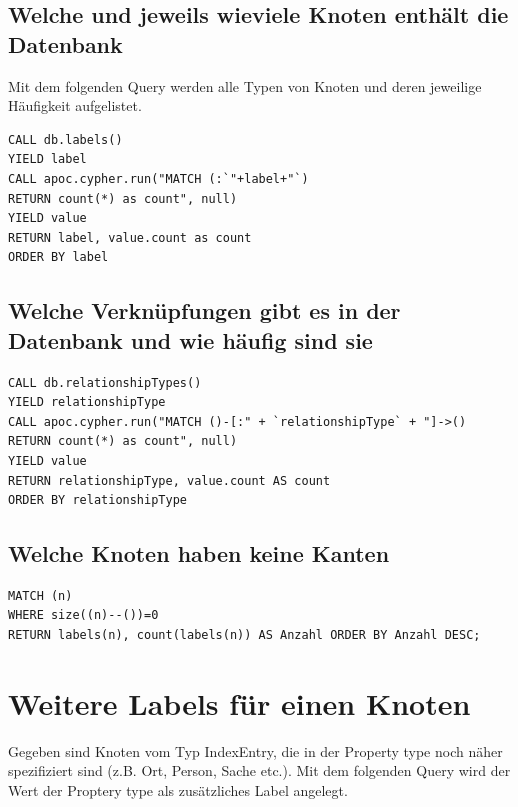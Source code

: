 \documentclass[ngerman,]{scrreprt}
\begin{document}
\subsection{Welche und jeweils wieviele Knoten enthält die Datenbank}\label{welche-und-jeweils-wieviele-knoten-enthuxe4lt-die-datenbank}

Mit dem folgenden Query werden alle Typen von Knoten und deren jeweilige Häufigkeit aufgelistet.

\begin{verbatim}
CALL db.labels()
YIELD label
CALL apoc.cypher.run("MATCH (:`"+label+"`)
RETURN count(*) as count", null)
YIELD value
RETURN label, value.count as count
ORDER BY label
\end{verbatim}

\subsection{Welche Verknüpfungen gibt es in der Datenbank und wie häufig sind sie}\label{welche-verknuxfcpfungen-gibt-es-in-der-datenbank-und-wie-huxe4ufig-sind-sie}

\begin{verbatim}
CALL db.relationshipTypes()
YIELD relationshipType
CALL apoc.cypher.run("MATCH ()-[:" + `relationshipType` + "]->()
RETURN count(*) as count", null)
YIELD value
RETURN relationshipType, value.count AS count
ORDER BY relationshipType
\end{verbatim}

\subsection{Welche Knoten haben keine Kanten}\label{welche-knoten-haben-keine-kanten}

\begin{verbatim}
MATCH (n)
WHERE size((n)--())=0
RETURN labels(n), count(labels(n)) AS Anzahl ORDER BY Anzahl DESC;
\end{verbatim}

\section{Weitere Labels für einen Knoten}\label{weitere-labels-fuxfcr-einen-knoten}

Gegeben sind Knoten vom Typ IndexEntry, die in der Property type noch näher spezifiziert sind (z.B. Ort, Person, Sache etc.). Mit dem folgenden Query wird der Wert der Proptery type als zusätzliches Label angelegt.
\end{document}
